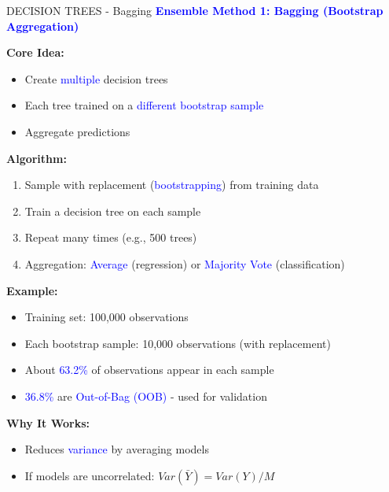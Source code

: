 \documentclass[8pt]{beamer}
\begin{document}
	\begin{frame}{DECISION TREES - Bagging}
		\fontsize{6.5}{7.5}\selectfont
		\textcolor{blue}{\textbf{Ensemble Method 1: Bagging (Bootstrap Aggregation)}}
		
		\textbf{Core Idea:}
		\begin{itemize}
			\item Create \textcolor{blue}{multiple} decision trees
			\item Each tree trained on a \textcolor{blue}{different bootstrap sample}
			\item Aggregate predictions
		\end{itemize}
		
		\textbf{Algorithm:}
		\begin{enumerate}
			\item Sample with replacement (\textcolor{blue}{bootstrapping}) from training data
			\item Train a decision tree on each sample
			\item Repeat many times (e.g., 500 trees)
			\item Aggregation: \textcolor{blue}{Average} (regression) or \textcolor{blue}{Majority Vote} (classification)
		\end{enumerate}
		
		\textbf{Example:}
		\begin{itemize}
			\item Training set: 100,000 observations
			\item Each bootstrap sample: 10,000 observations (with replacement)
			\item About \textcolor{blue}{63.2\%} of observations appear in each sample
			\item \textcolor{blue}{36.8\%} are \textcolor{blue}{Out-of-Bag (OOB)} - used for validation
		\end{itemize}
		
		\textbf{Why It Works:}
		\begin{itemize}
			\item Reduces \textcolor{blue}{variance} by averaging models
			\item If models are uncorrelated: $Var(\bar{Y}) = Var(Y)/M$
		\end{itemize}
	\end{frame}
	
\end{document}

